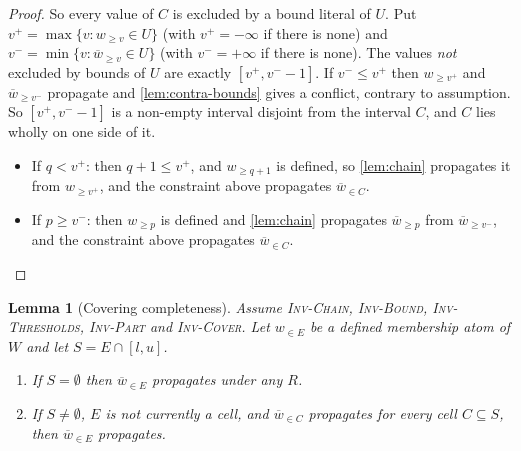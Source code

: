 \documentclass[11pt,a4paper]{article}
\theoremstyle{plain}
\newtheorem{lemmaN}{Lemma}
\theoremstyle{definition}
\theoremstyle{remark}
\newcommand{\atge}[2]{#1_{\geq #2}}
\newcommand{\natge}[2]{\overline{#1}_{\geq #2}}
\newcommand{\atset}[2]{#1_{\in #2}}
\newcommand{\natset}[2]{\overline{#1}_{\in #2}}
\newcommand{\inv}[1]{\textnormal{\textsc{Inv-#1}}}
\newcommand{\invChain}{\inv{Chain}}
\newcommand{\invThresholds}{\inv{Thresholds}}
\newcommand{\invPart}{\inv{Part}}
\newcommand{\invCover}{\inv{Cover}}
\begin{document}
\begin{proof}
So every value of $C$ is excluded by a bound literal of $U$.  Put
$v^{+}=\max\{v : \atge{w}{v}\in U\}$ (with $v^{+}=-\infty$ if there is none)
and $v^{-}=\min\{v : \natge{w}{v}\in U\}$ (with $v^{-}=+\infty$ if
there is none).  The values \emph{not} excluded by bounds of $U$ are exactly
$[v^{+},v^{-}-1]$.  If $v^{-}\leq v^{+}$ then $\atge{w}{v^{+}}$ and
$\natge{w}{v^{-}}$ propagate and \cref{lem:contra-bounds} gives a
conflict, contrary to assumption.  So $[v^{+},v^{-}-1]$ is a non-empty interval
disjoint from the interval $C$, and $C$ lies wholly on one side of it.
\begin{itemize}[itemsep=1pt]
  \item If $q<v^{+}$: then $q+1\leq v^{+}$, and $\atge{w}{q+1}$ is defined, so
    \cref{lem:chain} propagates it from $\atge{w}{v^{+}}$, and the constraint
    above propagates $\natset{w}{C}$.
  \item If $p\geq v^{-}$: then $\atge{w}{p}$ is defined and \cref{lem:chain}
    propagates $\natge{w}{p}$ from $\natge{w}{v^{-}}$, and the constraint
    above propagates $\natset{w}{C}$.
    \qedhere
\end{itemize}
\end{proof}

\begin{lemmaN}[Covering completeness]
\label{lem:covering}
Assume \invChain{}, \inv{Bound}, \invThresholds{}, \invPart{} and \invCover{}.  Let
$\atset{w}{E}$ be a defined membership atom of $W$ and let $S=E\cap[l,u]$.
\begin{enumerate}[label=(\alph*),itemsep=1pt]
  \item If $S=\emptyset$ then $\natset{w}{E}$ propagates under any $R$.
  \item If $S\neq\emptyset$, $E$ is not currently a cell, and $\natset{w}{C}$
    propagates for every cell $C\subseteq S$, then $\natset{w}{E}$ propagates.
\end{enumerate}
\end{lemmaN}
\end{document}
